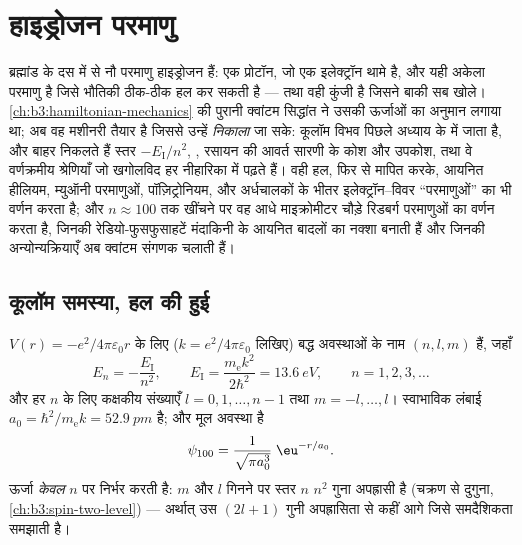 \chapter{हाइड्रोजन परमाणु}\label{ch:b3:hydrogen-atom}

ब्रह्मांड के दस में से नौ परमाणु हाइड्रोजन हैं: एक प्रोटॉन, जो एक
इलेक्ट्रॉन थामे है, और यही अकेला परमाणु है जिसे भौतिकी ठीक-ठीक हल कर
सकती है --- तथा वही कुंजी है जिसने बाकी सब खोले। \cref{ch:b3:hamiltonian-mechanics}
की पुरानी क्वांटम सिद्धांत ने उसकी ऊर्जाओं का अनुमान लगाया था; अब वह
मशीनरी तैयार है जिससे उन्हें \emph{निकाला} जा सके: कूलॉम विभव पिछले
अध्याय के  में जाता है, और बाहर
निकलते हैं स्तर $-E_{\text{I}}/n^2$, , रसायन की आवर्त
सारणी के कोश और उपकोश, तथा वे वर्णक्रमीय श्रेणियाँ जो खगोलविद हर
नीहारिका में पढ़ते हैं। वही हल, फिर से मापित करके,
आयनित हीलियम, म्युऑनी परमाणुओं, पॉज़िट्रोनियम, और अर्धचालकों के भीतर
इलेक्ट्रॉन--विवर ``परमाणुओं'' का भी वर्णन करता है; और $n
\approx 100$ तक खींचने पर वह आधे माइक्रोमीटर चौड़े रिडबर्ग परमाणुओं
का वर्णन करता है, जिनकी रेडियो-फुसफुसाहटें मंदाकिनी के आयनित बादलों का
नक्शा बनाती हैं और जिनकी अन्योन्यक्रियाएँ अब क्वांटम संगणक चलाती हैं।

\section{कूलॉम समस्या, हल की हुई}

\begin{theorem}[हाइड्रोजन के स्तर]\label{thm:b3:hydrogen-atom:levels}
$V(r) = -e^2/4\pi\varepsilon_0 r$ के लिए ($k = e^2/4\pi
\varepsilon_0$ लिखिए) बद्ध अवस्थाओं के नाम $(n, l, m)$ हैं, जहाँ
\[
E_n = -\frac{E_{\text{I}}}{n^2} , \qquad
E_{\text{I}} = \frac{m_{\text{e}}k^2}{2\hbar^2} = \qty{13.6}{eV} ,
\qquad n = 1, 2, 3, \dots
\]
और हर $n$ के लिए कक्षकीय संख्याएँ $l = 0, 1, \dots, n-1$ तथा
$m = -l, \dots, l$। स्वाभाविक लंबाई  $a_0 =
\hbar^2/m_{\text{e}}k = \qty{52.9}{pm}$ है; और मूल अवस्था है
\[
\psi_{100} = \frac{1}{\sqrt{\pi a_0^3}}\;\eu^{-r/a_0} .
\]
ऊर्जा \emph{केवल} $n$ पर निर्भर करती है: $m$ और
$l$ गिनने पर स्तर $n$ $n^2$ गुना अपह्रासी है (चक्रण से दुगुना,
\cref{ch:b3:spin-two-level}) --- अर्थात् उस $(2l+1)$ गुनी
अपह्रासिता से कहीं आगे जिसे समदैशिकता समझाती है।
\end{theorem}


